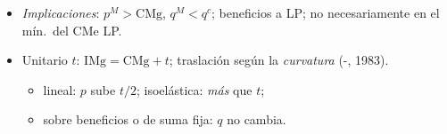 \documentclass{article}
\begin{document}
\begin{columnas}
\begin{itemize}
\item \emph{Implicaciones}: $p^M>\mathrm{CMg}$, $q^M<q^c$; beneficios a LP; no necesariamente en el mín.\ del CMe LP.
\end{itemize}
\begin{itemize}
\item Unitario $t$: $\mathrm{IMg}=\mathrm{CMg}+t$; traslación según la \emph{curvatura} (-, 1983).
  \begin{itemize}
  \item lineal: $p$ sube $t/2$; isoelástica: \emph{más} que $t$;
  \item sobre beneficios o de suma fija: $q$ no cambia.
  \end{itemize}
\end{itemize}


\end{columnas}
\end{document}
